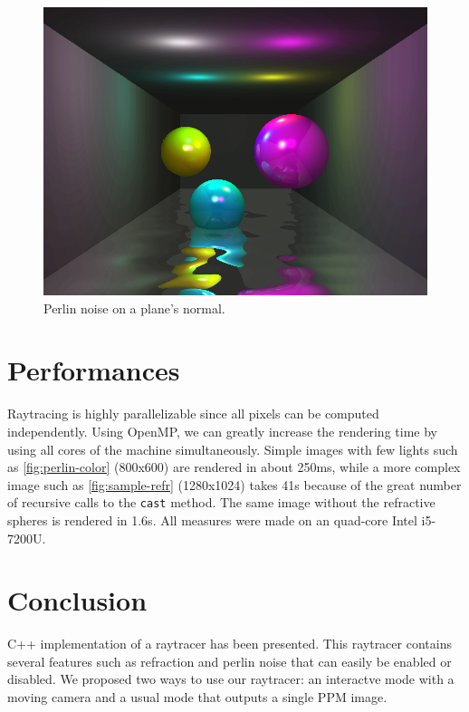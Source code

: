 \documentclass[a4paper,12pt,journal,twoside,compsoc]{PPIEEEtran}
\begin{document}
\begin{figure}
  \begin{center}
    \includegraphics[width=0.7\linewidth]{perlin-normal.png}
  \end{center}
  \caption{Perlin noise on a plane's normal.}
  \label{fig:perlin-normal}
\end{figure}

\section{Performances}
Raytracing is highly parallelizable since all pixels can be computed
independently.  Using OpenMP, we can greatly increase the rendering time by
using all cores of the machine simultaneously.  Simple images with few lights
such as \cref{fig:perlin-color} (800x600) are rendered in about 250ms, while a
more complex image such as \cref{fig:sample-refr} (1280x1024) takes 41s because
of the great number of recursive calls to the \texttt{cast} method.  The same
image without the refractive spheres is rendered in 1.6s.  All measures were
made on an quad-core Intel i5-7200U.

\section{Conclusion}
\label{concl}
 C++ implementation of a raytracer has been presented. This
raytracer contains several features such as refraction and perlin noise that can
easily be enabled or disabled. We proposed two ways to use our raytracer: an
interactve mode with a moving camera and a usual mode that outputs a single PPM
image.




\newpage
\onecolumn
\end{document}
